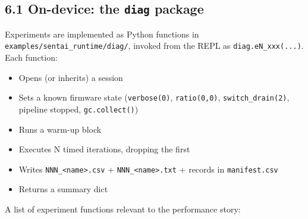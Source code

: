 \subsection{\texorpdfstring{6.1 On-device: the \texttt{diag}
package}{6.1 On-device: the diag package}}\label{on-device-the-diag-package}

Experiments are implemented as Python functions in
\texttt{examples/sentai\_runtime/diag/}, invoked from the REPL as
\texttt{diag.eN\_xxx(...)}. Each function:

\begin{itemize}
\tightlist
\item
  Opens (or inherits) a session
\item
  Sets a known firmware state (\texttt{verbose(0)}, \texttt{ratio(0,0)},
  \texttt{switch\_drain(2)}, pipeline stopped, \texttt{gc.collect()})
\item
  Runs a warm-up block
\item
  Executes N timed iterations, dropping the first
\item
  Writes \texttt{NNN\_\textless{}name\textgreater{}.csv} +
  \texttt{NNN\_\textless{}name\textgreater{}.txt} + records in
  \texttt{manifest.csv}
\item
  Returns a summary dict
\end{itemize}

A list of experiment functions relevant to the performance story:

